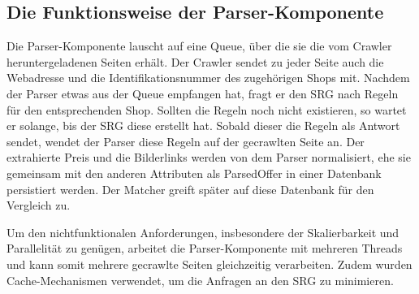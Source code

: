 \subsection{Die Funktionsweise der Parser-Komponente}
\label{subsec:funktionsweise-parser}

Die Parser-Komponente lauscht auf eine Queue, über die sie die vom Crawler heruntergeladenen Seiten erhält.
Der Crawler sendet zu jeder Seite auch die Webadresse und die Identifikationsnummer des zugehörigen Shops mit.
Nachdem der Parser etwas aus der Queue empfangen hat, fragt er den SRG nach Regeln für den entsprechenden Shop.
Sollten die Regeln noch nicht existieren, so wartet er solange, bis der SRG diese erstellt hat.
Sobald dieser die Regeln als Antwort sendet, wendet der Parser diese Regeln auf der gecrawlten Seite an.
Der extrahierte Preis und die Bilderlinks werden von dem Parser normalisiert, ehe sie gemeinsam mit den anderen
Attributen als ParsedOffer in einer Datenbank persistiert werden.
Der Matcher greift später auf diese Datenbank für den Vergleich zu.

Um den nichtfunktionalen Anforderungen, insbesondere der Skalierbarkeit und Parallelität zu genügen, arbeitet die
Parser-Komponente mit mehreren Threads und kann somit mehrere gecrawlte Seiten gleichzeitig verarbeiten.
Zudem wurden Cache-Mechanismen verwendet, um die Anfragen an den SRG zu minimieren.
